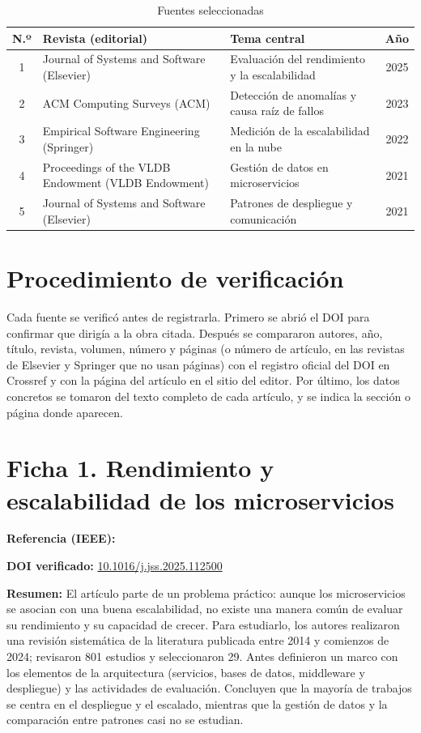 \documentclass[11pt,a4paper]{article}
\newcommand{\campo}[1]{\par\textbf{#1}\enspace}
\begin{document}
\begin{table}[h]
\centering
\small
\caption{Fuentes seleccionadas}
\label{tab:fuentes}
\begin{tabularx}{\textwidth}{@{}clXc@{}}
\toprule
\textbf{N.º} & \textbf{Revista (editorial)} & \textbf{Tema central} & \textbf{Año} \\
\midrule
1 & Journal of Systems and Software (Elsevier) & Evaluación del rendimiento y la escalabilidad & 2025 \\
2 & ACM Computing Surveys (ACM) & Detección de anomalías y causa raíz de fallos & 2023 \\
3 & Empirical Software Engineering (Springer) & Medición de la escalabilidad en la nube & 2022 \\
4 & Proceedings of the VLDB Endowment (VLDB Endowment) & Gestión de datos en microservicios & 2021 \\
5 & Journal of Systems and Software (Elsevier) & Patrones de despliegue y comunicación & 2021 \\
\bottomrule
\end{tabularx}
\end{table}

\section*{Procedimiento de verificación}

Cada fuente se verificó antes de registrarla. Primero se abrió el DOI para confirmar que dirigía a la obra citada. Después se compararon autores, año, título, revista, volumen, número y páginas (o número de artículo, en las revistas de Elsevier y Springer que no usan páginas) con el registro oficial del DOI en Crossref y con la página del artículo en el sitio del editor. Por último, los datos concretos se tomaron del texto completo de cada artículo, y se indica la sección o página donde aparecen.

\section*{Ficha 1. Rendimiento y escalabilidad de los microservicios}

\campo{Referencia (IEEE):} 

\campo{DOI verificado:} \href{https://doi.org/10.1016/j.jss.2025.112500}{10.1016/j.jss.2025.112500}

\campo{Resumen:} El artículo parte de un problema práctico: aunque los microservicios se asocian con una buena escalabilidad, no existe una manera común de evaluar su rendimiento y su capacidad de crecer. Para estudiarlo, los autores realizaron una revisión sistemática de la literatura publicada entre 2014 y comienzos de 2024; revisaron 801 estudios y seleccionaron 29. Antes definieron un marco con los elementos de la arquitectura (servicios, bases de datos, middleware y despliegue) y las actividades de evaluación. Concluyen que la mayoría de trabajos se centra en el despliegue y el escalado, mientras que la gestión de datos y la comparación entre patrones casi no se estudian.
\end{document}
